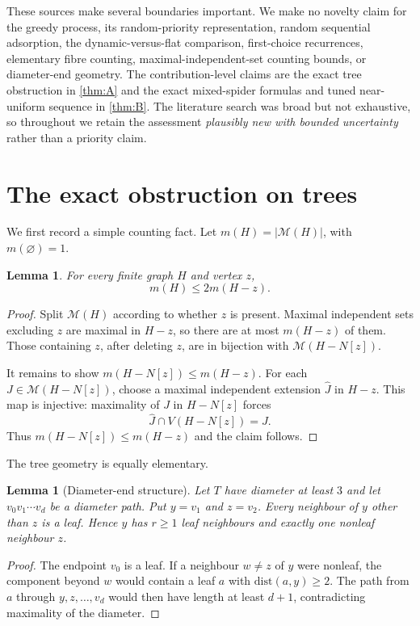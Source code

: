 \documentclass[11pt]{article}
\newtheorem{lemma}[theorem]{Lemma}
\theoremstyle{definition}
\newcommand{\M}{\mathcal{M}}
\begin{document}
These sources make several boundaries important.  We make no novelty claim for the greedy process, its random-priority representation, random sequential adsorption, the dynamic-versus-flat comparison, first-choice recurrences, elementary fibre counting, maximal-independent-set counting bounds, or diameter-end geometry.  The contribution-level claims are the exact tree obstruction in \cref{thm:A} and the exact mixed-spider formulas and tuned near-uniform sequence in \cref{thm:B}.  The literature search was broad but not exhaustive, so throughout we retain the assessment \emph{plausibly new with bounded uncertainty} rather than a priority claim.

\section{The exact obstruction on trees}\label{sec:Aproof}

We first record a simple counting fact.  Let $m(H)=|\M(H)|$, with $m(\varnothing)=1$.

\begin{lemma}\label{lem:count}
For every finite graph $H$ and vertex $z$,
\[
 m(H)\le 2m(H-z).
\]
\end{lemma}

\begin{proof}
Split $\M(H)$ according to whether $z$ is present.  Maximal independent sets excluding $z$ are maximal in $H-z$, so there are at most $m(H-z)$ of them.  Those containing $z$, after deleting $z$, are in bijection with $\M(H-N[z])$.

It remains to show $m(H-N[z])\le m(H-z)$.  For each $J\in\M(H-N[z])$, choose a maximal independent extension $\widehat J$ in $H-z$.  This map is injective: maximality of $J$ in $H-N[z]$ forces
\[
 \widehat J\cap V(H-N[z])=J.
\]
Thus $m(H-N[z])\le m(H-z)$ and the claim follows.
\end{proof}

The tree geometry is equally elementary.

\begin{lemma}[Diameter-end structure]\label{lem:diameter}
Let $T$ have diameter at least $3$ and let $v_0v_1\cdots v_d$ be a diameter path.  Put $y=v_1$ and $z=v_2$.  Every neighbour of $y$ other than $z$ is a leaf.  Hence $y$ has $r\ge1$ leaf neighbours and exactly one nonleaf neighbour $z$.
\end{lemma}

\begin{proof}
The endpoint $v_0$ is a leaf.  If a neighbour $w\ne z$ of $y$ were nonleaf, the component beyond $w$ would contain a leaf $a$ with $\mathrm{dist}(a,y)\ge2$.  The path from $a$ through $y,z,\dots,v_d$ would then have length at least $d+1$, contradicting maximality of the diameter.
\end{proof}
\end{document}
